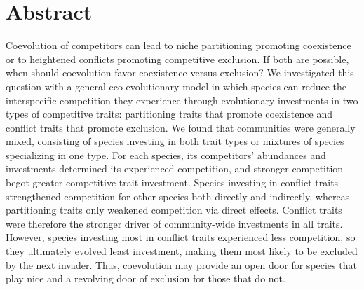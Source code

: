 \section*{Abstract}

Coevolution of competitors can lead to niche partitioning promoting
coexistence or to heightened conflicts promoting competitive exclusion. 
If both are possible, when should coevolution favor coexistence versus
exclusion? We investigated this question with a general eco-evolutionary 
model in which species can reduce the interspecific competition they 
experience through evolutionary investments in two types of competitive traits:
partitioning traits that promote coexistence and conflict traits that promote
exclusion. We found that communities were generally mixed, consisting of species
investing in both trait types or mixtures of species specializing in one type.
For each species, its competitors’ abundances and investments determined its
experienced competition, and stronger competition begot greater competitive
trait investment. Species investing in conflict traits strengthened competition
for other species both directly and indirectly, whereas partitioning traits only
weakened competition via direct effects. Conflict traits were therefore the
stronger driver of community-wide investments in all traits. However, species
investing most in conflict traits experienced less competition, so they
ultimately evolved least investment, making them most likely to be excluded by
the next invader. Thus, coevolution may provide an open door for species that
play nice and a revolving door of exclusion for those that do not. 
